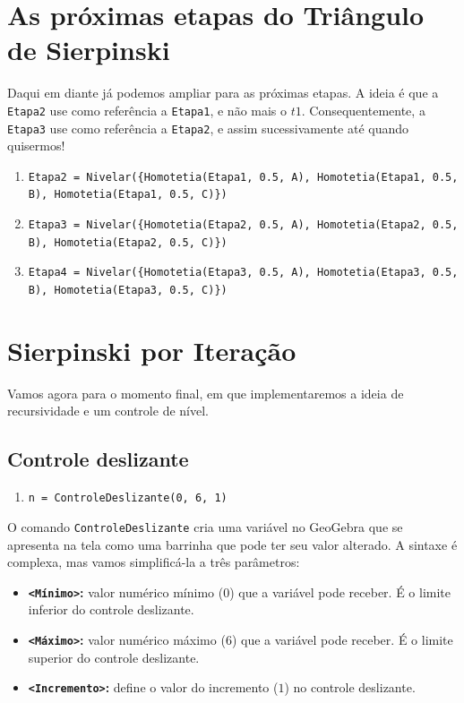 \documentclass[12pt,a4paper]{report}
\begin{document}
	\section{As próximas etapas do Triângulo de Sierpinski}
	
	Daqui em diante já podemos ampliar para as próximas etapas. A ideia é que a \texttt{Etapa2} use como referência a \texttt{Etapa1}, e não mais o $t1$. Consequentemente, a \texttt{Etapa3} use como referência a \texttt{Etapa2}, e assim sucessivamente até quando quisermos!
	
	\begin{enumerate}[resume]	
		\item \texttt{Etapa2 = Nivelar(\{Homotetia(Etapa1, 0.5, A), Homotetia(Etapa1, 0.5, B), 
			Homotetia(Etapa1, 0.5, C)\})}
			
		\item \texttt{Etapa3 = Nivelar(\{Homotetia(Etapa2, 0.5, A), Homotetia(Etapa2, 0.5, B), 
			Homotetia(Etapa2, 0.5, C)\})}
			
		\item \texttt{Etapa4 = Nivelar(\{Homotetia(Etapa3, 0.5, A), Homotetia(Etapa3, 0.5, B), 
			Homotetia(Etapa3, 0.5, C)\})}
	\end{enumerate}
	
	\section{Sierpinski por Iteração}
	
	Vamos agora para o momento final, em que implementaremos a ideia de recursividade e um controle de nível.
		
	\subsection{Controle deslizante}
	
	\begin{enumerate}[start=5]
		\item \texttt{n = ControleDeslizante(0, 6, 1)}
	\end{enumerate}
	
	O comando \texttt{ControleDeslizante} cria uma variável no GeoGebra que se apresenta na tela como uma barrinha que pode ter seu valor alterado. A sintaxe é complexa, mas vamos simplificá-la a três parâmetros:
	
	\begin{itemize}
		\item \textbf{\texttt{<Mínimo>}:} valor numérico mínimo ($0$) que a variável pode receber. É o limite inferior do controle deslizante.
		\item \textbf{\texttt{<Máximo>}:} valor numérico máximo ($6$) que a variável pode receber. É o limite superior do controle deslizante.
		\item \textbf{\texttt{<Incremento>}:} define o valor do incremento ($1$) no controle deslizante.
	\end{itemize}
	
\end{document}
